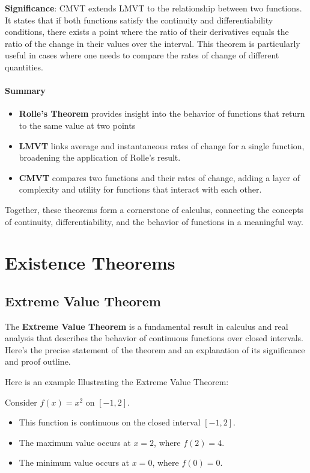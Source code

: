 \documentclass[a4paper,12pt]{book}
\begin{document}
\textbf{Significance}: CMVT extends LMVT to the relationship between two functions. It states that if both functions satisfy the continuity and differentiability conditions, there exists a point where the ratio of their derivatives equals the ratio of the change in their values over the interval. This theorem is particularly useful in cases where one needs to compare the rates of change of different quantities.

\subsubsection{Summary}

\begin{itemize}
	\item
	\textbf{Rolle's Theorem} provides insight into the behavior of functions that return to the same value at two points
	\item
	\textbf{LMVT} links average and instantaneous rates of change for a single function, broadening the application of Rolle's result.
	\item 
	\textbf{CMVT} compares two functions and their rates of change, adding a layer of complexity and utility for functions that interact with each other.	
\end{itemize}

Together, these theorems form a cornerstone of calculus, connecting the concepts of continuity, differentiability, and the behavior of functions in a meaningful way.

\chapter{Existence Theorems}

\section{Extreme Value Theorem}

The \textbf{Extreme Value Theorem} is a fundamental result in calculus and real analysis that describes the behavior of continuous functions over closed intervals. Here's the precise statement of the theorem and an explanation of its significance and proof outline.

\hfill

Here is an example Illustrating the Extreme Value Theorem:
	
Consider \( f(x) = x^2 \) on \([-1, 2]\).
	
\begin{itemize}
	\item 
	This function is continuous on the closed interval \([-1, 2]\).
	\item 
	The maximum value occurs at \( x = 2 \), where \( f(2) = 4 \).
	\item 
	The minimum value occurs at \( x = 0 \), where \( f(0) = 0 \).
\end{itemize}
\end{document}
